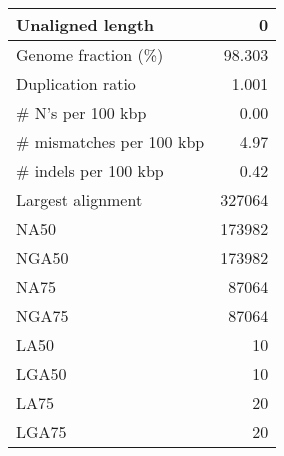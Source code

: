 \documentclass[12pt,a4paper]{article}
\begin{document}
\begin{table}[ht]
\begin{center}
\begin{tabular}{|l*{1}{|r}|}
Unaligned length & 0 \\ \hline
Genome fraction (\%) & 98.303 \\ \hline
Duplication ratio & 1.001 \\ \hline
\# N's per 100 kbp & 0.00 \\ \hline
\# mismatches per 100 kbp & 4.97 \\ \hline
\# indels per 100 kbp & 0.42 \\ \hline
Largest alignment & 327064 \\ \hline
NA50 & 173982 \\ \hline
NGA50 & 173982 \\ \hline
NA75 & 87064 \\ \hline
NGA75 & 87064 \\ \hline
LA50 & 10 \\ \hline
LGA50 & 10 \\ \hline
LA75 & 20 \\ \hline
LGA75 & 20 \\ \hline
\end{tabular}
\end{center}
\end{table}
\end{document}
